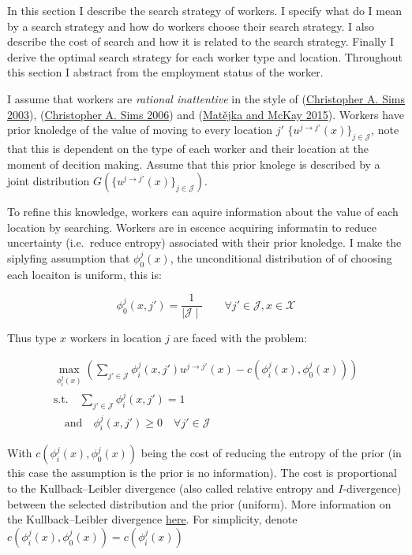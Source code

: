 \documentclass[
  letterpaper,
  DIV=11,
  numbers=noendperiod]{scrartcl}
\begin{document}
In this section I describe the search strategy of workers. I specify
what do I mean by a search strategy and how do workers choose their
search strategy. I also describe the cost of search and how it is
related to the search strategy. Finally I derive the optimal search
strategy for each worker type and location. Throughout this section I
abstract from the employment status of the worker.

I assume that workers are \emph{rational inattentive} in the style of
(\protect\hyperlink{ref-simsImplicationsRationalInattention2003}{Christopher
A. Sims 2003}),
(\protect\hyperlink{ref-simsRationalInattentionLinearQuadratic2006}{Christopher
A. Sims 2006}) and
(\protect\hyperlink{ref-matejkaRationalInattentionDiscrete2015}{Matějka
and McKay 2015}). Workers have prior knoledge of the value of moving to
every location \(j'\) \(\{u^{j\to j'}(x)\}_{j \in \mathcal{J}}\), note
that this is dependent on the type of each worker and their location at
the moment of decition making. Assume that this prior knolege is
described by a joint distribution
\(G\left(\{u^{j\to j'}(x)\}_{j \in \mathcal{J}} \right)\).

To reﬁne this knowledge, workers can aquire information about the value
of each location by searching. Workers are in escence acquiring
informatin to reduce uncertainty (i.e.~reduce entropy) associated with
their prior knoledge. I make the siplyfing assumption that
\(\phi^j_0(x)\), the unconditional distribution of of choosing each
locaiton is uniform, this is:

\[\phi^j_0(x, j') = \frac{1}{\mid \mathcal{J} \mid} \qquad 
\forall j' \in \mathcal{J}, x \in \mathcal{X}\]

Thus type \(x\) workers in location \(j\) are faced with the problem:

\begin{align*}
\max_{\phi_i^j(x)} \left( \sum_{j' \in \mathcal{J}} \phi_i^j(x, j') u^{j\to j'}(x) - c(\phi_i^j(x), \phi^j_0(x))  \right)\\
\text{s.t.} \quad \sum_{j'\in \mathcal{J}}\phi^j_i(x, j') = 1 \\
\quad \text{and} \quad \phi^j_i(x, j') \geq 0 \quad \forall j' \in \mathcal{J}
\end{align*}

With \(c(\phi_i^j(x), \phi^j_0(x))\) being the cost of reducing the
entropy of the prior (in this case the assumption is the prior is no
information). The cost is proportional to the Kullback--Leibler
divergence (also called relative entropy and \(I\)-divergence) between
the selected distribution and the prior (uniform). More information on
the Kullback--Leibler divergence
\href{https://en.wikipedia.org/wiki/Kullback\%E2\%80\%93Leibler_divergence}{here}.
For simplicity, denote \(c(\phi_i^j(x), \phi^j_0(x)) = c(\phi_i^j(x))\)
\end{document}
